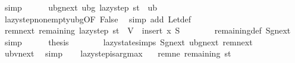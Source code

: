 \begin{isabellebody}
\ simp\isanewline
\ \ \ \ \isamarkupfalse%
\ ubg{\isacharunderscore}{\kern0pt}next{\isacharcolon}{\kern0pt}\ {\isachardoublequoteopen}ubg\ {\isacharparenleft}{\kern0pt}lazy{\isacharunderscore}{\kern0pt}step\ {\isacharquery}{\kern0pt}st{\isacharparenright}{\kern0pt}\ {\isacharequal}{\kern0pt}\ {\isacharquery}{\kern0pt}ub{\isacharprime}{\kern0pt}{\isachardoublequoteclose}\isanewline
\ \ \ \ \ \ \isamarkupfalse%
\ lazy{\isacharunderscore}{\kern0pt}step{\isacharunderscore}{\kern0pt}nonempty{\isacharunderscore}{\kern0pt}ubg{\isacharbrackleft}{\kern0pt}OF\ False{\isacharbrackright}{\kern0pt}\ \isamarkupfalse%
\ {\isacharparenleft}{\kern0pt}simp\ add{\isacharcolon}{\kern0pt}\ Let{\isacharunderscore}{\kern0pt}def{\isacharparenright}{\kern0pt}\isanewline
\ \ \ \ \isamarkupfalse%
\ rem{\isacharunderscore}{\kern0pt}next{\isacharcolon}{\kern0pt}\ {\isachardoublequoteopen}remaining\ {\isacharparenleft}{\kern0pt}lazy{\isacharunderscore}{\kern0pt}step\ {\isacharquery}{\kern0pt}st{\isacharparenright}{\kern0pt}\ {\isacharequal}{\kern0pt}\ V\ {\isacharminus}{\kern0pt}\ insert\ {\isacharquery}{\kern0pt}x\ {\isacharquery}{\kern0pt}S{\isachardoublequoteclose}\isanewline
\ \ \ \ \ \ \isamarkupfalse%
\ remaining{\isacharunderscore}{\kern0pt}def\ Sg{\isacharunderscore}{\kern0pt}next\ \isamarkupfalse%
\ simp\isanewline
\isanewline
\ \ \ \ \isamarkupfalse%
\ {\isacharquery}{\kern0pt}thesis\isanewline
\ \ \ \ \ \ \isamarkupfalse%
\ lazy{\isacharunderscore}{\kern0pt}state{\isachardot}{\kern0pt}simps\ Sg{\isacharunderscore}{\kern0pt}next\ ubg{\isacharunderscore}{\kern0pt}next\ rem{\isacharunderscore}{\kern0pt}next\isanewline
\ \ \ \ \ \ \isamarkupfalse%
\ ubv{\isacharunderscore}{\kern0pt}next\ \isamarkupfalse%
\ simp\isanewline
\ \ \isamarkupfalse%
\isanewline
{}\isamarkupfalse%
%
\endisatagproof
{\isafoldproof}%
%
\isadelimproof
%
\endisadelimproof
%
\isadelimdocument
%
\endisadelimdocument
%
\isatagdocument
%
\isamarkuptrue%
%
\endisatagdocument
{\isafolddocument}%
%
\isadelimdocument
%
\endisadelimdocument
{}\isamarkupfalse%
\ lazy{\isacharunderscore}{\kern0pt}step{\isacharunderscore}{\kern0pt}is{\isacharunderscore}{\kern0pt}argmax{\isacharcolon}{\kern0pt}\isanewline
\ \ \ rem{\isacharunderscore}{\kern0pt}ne{\isacharcolon}{\kern0pt}\ {\isachardoublequoteopen}remaining\ st\ {\isasymnoteq}\ {\isacharbraceleft}{\kern0pt}{\isacharbraceright}{\kern0pt}{\isachardoublequoteclose}\isanewline

\end{isabellebody}
